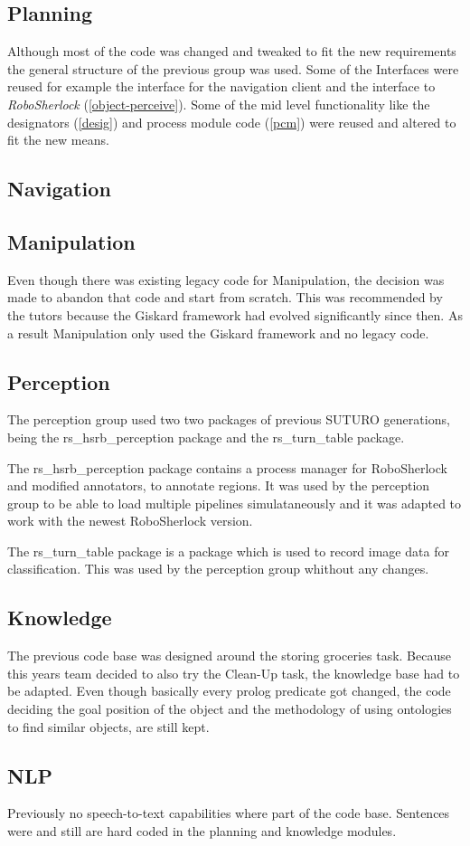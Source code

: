 \documentclass[main.tex]{subfiles}
\begin{document}
	\subsection{Planning}
		Although most of the code was changed and tweaked to fit the new requirements the general structure of the previous group was used. Some of the Interfaces were reused for example the interface for the navigation client and the interface to \textit{RoboSherlock} (\ref{object-perceive}). Some of the mid level functionality like the designators (\ref{desig}) and process module code (\ref{pcm}) were reused and altered to fit the new means.
	\subsection{Navigation}
	\subsection{Manipulation}
		Even though there was existing legacy code for Manipulation, the decision was made to abandon that code and start from scratch. This was recommended by the tutors because the Giskard framework had evolved significantly since then. As a result Manipulation only used the Giskard framework and no legacy code.
	\subsection{Perception}
	The perception group used two two packages of previous SUTURO generations, being the rs\_hsrb\_perception package and the rs\_turn\_table package.
	
	 The rs\_hsrb\_perception package contains a process manager for RoboSherlock and modified annotators, to annotate regions. It was used by the perception group to be able to load multiple pipelines simulataneously and it was adapted to work with the newest RoboSherlock version.
	 
	 The rs\_turn\_table package is a package which is used to record image data for classification. This was used by the perception group whithout any changes. 
	\subsection{Knowledge}
        The previous code base was designed around the storing groceries task. Because this years team decided to also try the Clean-Up task, the knowledge base had to be adapted. Even though basically every prolog predicate got changed, the code deciding the goal position of the object and the methodology of using ontologies to find similar objects, are still kept.
    \subsection{NLP}
        Previously no speech-to-text capabilities where part of the code base. Sentences were and still are hard coded in the planning and knowledge modules.
\end{document}
